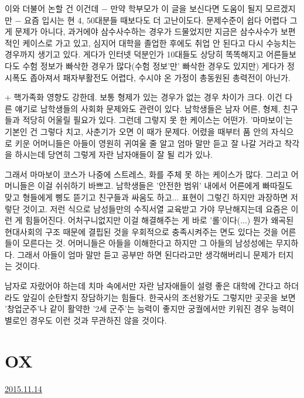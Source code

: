 이와 더불어 논할 건 이건데 $-$ 만약 학부모가 이 글을 보신다면 도움이 될지 모르겠지만 $-$
요즘 입시는 현 4, 50대분들 때보다도 더 고난이도다. 문제수준이 쉽다 어렵다 그게 문제가 아니다,
과거에야 삼수사수하는 경우가 드물었지만 지금은 삼수사수가 보편적인 케이스로 가고 있고,
심지어 대학을 졸업한 후에도 취업 안 된다고 다시 수능치는 경우까지 생기고 있다.
게다가 인터넷 덕분인가 10대들도 상당히 똑똑해지고 어른들보다도 수험 정보가 빠삭한 경우가 많다(수험 정보'만' 빠삭한 경우도 있지만)
게다가 정시폭도 좁아져서 패자부활전도 어렵다, 수시야 온 가정이 총동원된 총력전이 아닌가.
\vspace{5mm}

+ 핵가족화 영향도 강한데. 보통 형제가 있는 경우가 없는 경우 차이가 크다.
이건 다른 얘기로 남학생들의 사회화 문제와도 관련이 있다. 남학생들은 남자 어른, 형제, 친구들과 적당히 어울릴 필요가 있다.
그런데 그렇지 못 한 케이스는 어떤가. '마마보이'는 기본인 건 그렇다 치고, 사춘기가 오면 이 때가 문제다.
어렸을 때부터 품 안의 자식으로 키운 어머니들은 아들이 영원히 귀여울 줄 알고 엄마 말만 듣고 잘 나갈 거라고 착각을 하시는데
당연히 그렇게 자란 남자애들이 잘 될 리가 있나.
\vspace{5mm}

그래서 마마보이 코스가 나중에 스트레스, 화를 주체 못 하는 케이스가 많다. 그리고 어머니들은 이걸 쉬쉬하기 바쁘고.
남학생들은 '안전한 범위' 내에서 어른에게 빠따질도 맞고 형들에게 삥도 뜯기고 친구들과 싸움도 하고...
표현이 그렇긴 하지만 과장하면 저렇단 것이고.
저런 식으로 남성들만의 수직서열 교육받고 가야 무난해지는데 요즘은 이런 게 힘들어진다.
어처구니없지만 이걸 해결해주는 게 바로 '롤'이다(...)
뭔가 왜곡된 현대사회의 구조 때문에 결핍된 것을 우회적으로 충족시켜주는 면도 있다는 것을 어른들이 모른다는 것.
어머니들은 아들을 이해한다고 하지만 그 아들의 남성성에는 무지하다.
그래서 아들이 엄마 말만 듣고 공부만 하면 된다라고만 생각해버리니 문제가 터지는 것이다.
\vspace{5mm}

남자로 자랐어야 하는데 치마 속에서만 자란 남자애들이 설령 좋은 대학에 간다고 하더라도 앞길이 순탄할지 장담하기는 힘들다.
한국사의 조선왕가도 그렇지만 곳곳을 보면 '창업군주'나 같이 활약한 '2세 군주'는 능력이 좋지만
궁궐에서만 키워진 경우 능력이 별로인 경우도 이런 것과 무관하진 않을 것이다.
\vspace{5mm}







\section{OX}
\href{https://www.kockoc.com/Apoc/488094}{2015.11.14}

